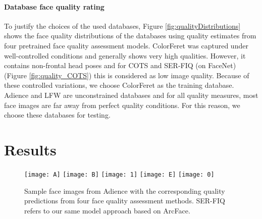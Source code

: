 \documentclass[10pt,twocolumn,letterpaper]{article}
\begin{document}
\paragraph{Database face quality rating}
To justify the choices of the used databases, Figure \ref{fig:qualityDistributions} shows the face quality distributions of the databases using quality estimates from four pretrained face quality assessment models.
ColorFeret was captured under well-controlled conditions and generally shows very high qualities.
However, it contains non-frontal head poses and for COTS and SER-FIQ (on FaceNet) (Figure \ref{fig:quality_COTS}) this is considered as low image quality.
Because of these controlled variations, we choose ColorFeret as the training database.
Adience and LFW are unconstrained databases and for all quality measures, most face images are far away from perfect quality conditions.
For this reason, we choose these databases for testing.

















\vspace{-0mm}

\section{Results}


\begin{figure}[h]
\centering\noindent
\texttt{[image: A]}
\texttt{[image: B]}
\texttt{[image: 1]}
\texttt{[image: E]}
\texttt{[image: 0]}
\caption{Sample face images from Adience with the corresponding quality predictions from four face quality assessment methods. SER-FIQ refers to our same model approach based on ArcFace.}
\label{fig:SampleImages}
\end{figure}
\end{document}

